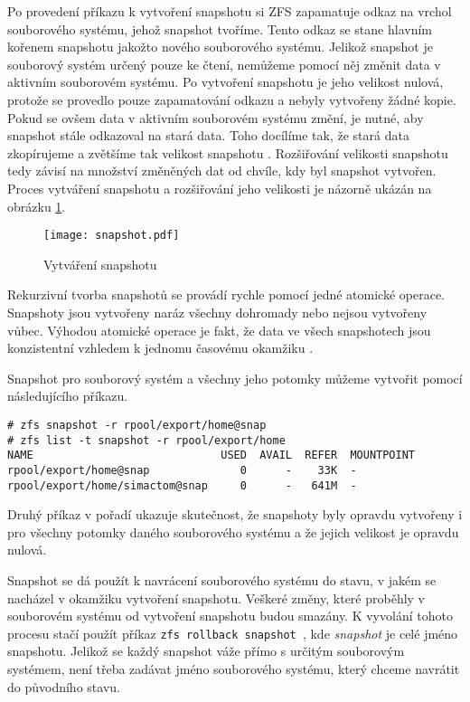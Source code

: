 Po provedení příkazu k vytvoření snapshotu si ZFS zapamatuje odkaz na vrchol souborového systému, jehož snapshot tvoříme. Tento odkaz se stane hlavním kořenem snapshotu jakožto nového souborového systému. Jelikož snapshot je souborový systém určený pouze ke čtení, nemůžeme pomocí něj změnit data v aktivním souborovém systému. Po vytvoření snapshotu je jeho velikost nulová, protože se provedlo pouze zapamatování odkazu a nebyly vytvořeny žádné kopie. Pokud se ovšem data v aktivním souborovém systému změní, je nutné, aby snapshot stále odkazoval na stará data. Toho docílíme tak, že stará data zkopírujeme a zvětšíme tak velikost snapshotu \cite{snapshot}. Rozšiřování velikosti snapshotu tedy závisí na množství změněných dat od chvíle, kdy byl snapshot vytvořen. Proces vytváření snapshotu a rozšiřování jeho velikosti je názorně ukázán na obrázku \ref{snapshotproces}.
\begin{figure}[h]
    \caption{Vytváření snapshotu}
    \label{snapshotproces}
    \texttt{[image: snapshot.pdf]}
\end{figure}

Rekurzivní tvorba snapshotů se provádí rychle pomocí jedné atomické operace. Snapshoty jsou vytvořeny naráz všechny dohromady nebo nejsou vytvořeny vůbec. Výhodou atomické operace je fakt, že data ve všech snapshotech jsou konzistentní vzhledem k jednomu časovému okamžiku \cite{snapshot}.

Snapshot pro souborový systém a všechny jeho potomky můžeme vytvořit pomocí následujícího příkazu.
\begin{verbatim}
# zfs snapshot -r rpool/export/home@snap
# zfs list -t snapshot -r rpool/export/home
NAME                             USED  AVAIL  REFER  MOUNTPOINT
rpool/export/home@snap              0      -    33K  -
rpool/export/home/simactom@snap     0      -   641M  -
\end{verbatim}
Druhý příkaz v pořadí ukazuje skutečnost, že snapshoty byly opravdu vytvořeny i pro všechny potomky daného souborového systému a že jejich velikost je opravdu nulová.

Snapshot se dá použít k navrácení souborového systému do stavu, v jakém se nacházel v okamžiku vytvoření snapshotu. Veškeré změny, které proběhly v souborovém systému od vytvoření snapshotu budou smazány. K vyvolání tohoto procesu stačí použít příkaz \verb|zfs rollback snapshot |, kde \emph{snapshot} je celé jméno snapshotu. Jelikož se každý snapshot váže přímo s určitým souborovým systémem, není třeba zadávat jméno souborového systému, který chceme navrátit do původního stavu. 